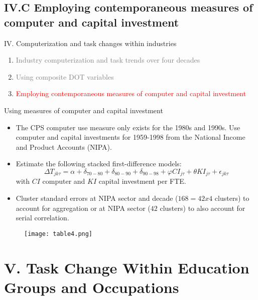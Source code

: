 \documentclass[notes=show]{beamer}
\begin{document}
\subsection{IV.C Employing contemporaneous measures of computer and capital investment}

\begin{frame}{IV. Computerization and task changes within industries}
\begin{enumerate}
\item[\textcolor{gray}{IV.A}] \textcolor{gray}{Industry computerization and task trends over four decades} \bigskip
\item[\textcolor{gray}{IV.B}] \textcolor{gray}{Using composite DOT variables} \bigskip
\item[\textcolor{red}{IV.C}] \textcolor{red}{Employing contemporaneous measures of computer and capital investment}
\end{enumerate}
\end{frame}

\begin{frame}{Using measures of computer and capital investment}
\begin{itemize}
\item The CPS computer use measure only exists for the 1980s and 1990s. Use computer and capital investments for 1959-1998 from the National Income and Product Accounts (NIPA). \medskip
\item Estimate the following stacked first-difference models:
\[
\Delta T_{jk \tau} = \alpha + \delta_{70-80} +\delta_{80-90} + \delta_{90-98} + \varphi CI_{j \tau} + \theta KI_{j \tau} + \epsilon_{jk \tau} \tag{14} \label{eq14}
\]
with $CI$ computer and $KI$ capital investment per FTE. \medskip
\item Cluster standard errors at NIPA sector and decade ($168=42x4$ clusters) to account for aggregation or at NIPA sector ($42$ clusters) to also account for serial correlation.  
\end{itemize}
\end{frame}

\newpage
\begin{center}
\begin{figure}
\texttt{[image: table4.png]}
\end{figure} 
\end{center}
\newpage

\section{V. Task Change Within Education Groups and Occupations}
\end{document}
